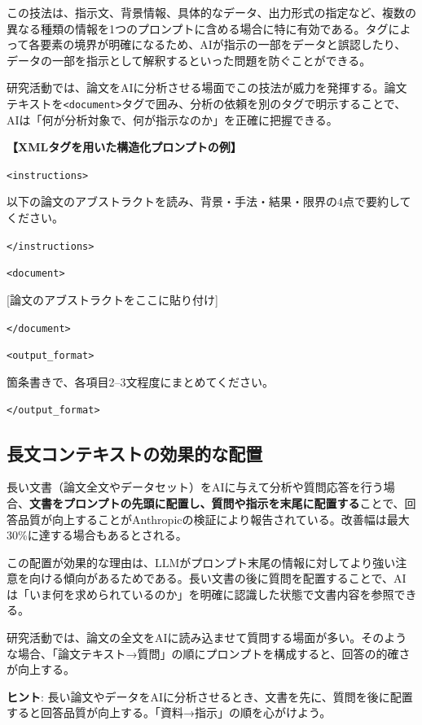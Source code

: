 この技法は、指示文、背景情報、具体的なデータ、出力形式の指定など、複数の異なる種類の情報を1つのプロンプトに含める場合に特に有効である。タグによって各要素の境界が明確になるため、AIが指示の一部をデータと誤認したり、データの一部を指示として解釈するといった問題を防ぐことができる。

研究活動では、論文をAIに分析させる場面でこの技法が威力を発揮する。論文テキストを\texttt{<document>}タグで囲み、分析の依頼を別のタグで明示することで、AIは「何が分析対象で、何が指示なのか」を正確に把握できる。

\begin{promptbox}
\textbf{【XMLタグを用いた構造化プロンプトの例】}

\texttt{<instructions>}

以下の論文のアブストラクトを読み、背景・手法・結果・限界の4点で要約してください。

\texttt{</instructions>}

\texttt{<document>}

{[}論文のアブストラクトをここに貼り付け]

\texttt{</document>}

\texttt{<output\_format>}

箇条書きで、各項目2--3文程度にまとめてください。

\texttt{</output\_format>}
\end{promptbox}

\subsection{長文コンテキストの効果的な配置}

長い文書（論文全文やデータセット）をAIに与えて分析や質問応答を行う場合、\textbf{文書をプロンプトの先頭に配置し、質問や指示を末尾に配置する}ことで、回答品質が向上することがAnthropicの検証により報告されている。改善幅は最大30\%に達する場合もあるとされる。

この配置が効果的な理由は、LLMがプロンプト末尾の情報に対してより強い注意を向ける傾向があるためである。長い文書の後に質問を配置することで、AIは「いま何を求められているのか」を明確に認識した状態で文書内容を参照できる。

研究活動では、論文の全文をAIに読み込ませて質問する場面が多い。そのような場合、「論文テキスト→質問」の順にプロンプトを構成すると、回答の的確さが向上する。

\begin{screen}
\textbf{ヒント}: 長い論文やデータをAIに分析させるとき、文書を先に、質問を後に配置すると回答品質が向上する。「資料→指示」の順を心がけよう。
\end{screen}

